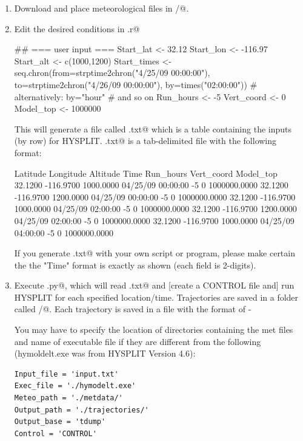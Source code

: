 \documentclass{article}
\renewenvironment{Schunk}{\vspace{\topsep}}{\vspace{\topsep}}
\begin{document}
\begin{enumerate}
\item Download and place meteorological files in \verb@metdata/@.
\item Edit the desired conditions in \verb@generateInput.r@
\begin{Schunk}
\begin{Soutput}
## === user input ===
Start_lat <- 32.12
Start_lon <- -116.97
Start_alt <- c(1000,1200)
Start_times <- seq.chron(from=strptime2chron("4/25/09 00:00:00"),
                         to=strptime2chron("4/26/09 00:00:00"),
                         by=times("02:00:00"))
                                        # alternatively: by="hour"
                                        # and so on
Run_hours <- -5
Vert_coord <- 0
Model_top <- 1000000
\end{Soutput}
\end{Schunk}

This will generate a file called \verb@input.txt@ which is a table containing
the inputs (by row) for HYSPLIT. \verb@input.txt@ is a tab-delimited
file with the following format:
  
\begin{Schunk}
\begin{Soutput}
Latitude  Longitude  Altitude  Time  Run_hours  Vert_coord  Model_top
32.1200  -116.9700  1000.0000  04/25/09 00:00:00  -5  0  1000000.0000
32.1200  -116.9700  1200.0000  04/25/09 00:00:00  -5  0  1000000.0000
32.1200  -116.9700  1000.0000  04/25/09 02:00:00  -5  0  1000000.0000
32.1200  -116.9700  1200.0000  04/25/09 02:00:00  -5  0  1000000.0000
32.1200  -116.9700  1000.0000  04/25/09 04:00:00  -5  0  1000000.0000
\end{Soutput}
\end{Schunk}

If you generate \verb@input.txt@ with your own script or program,
please make certain the the "Time" format is exactly as shown (each
field is 2-digits).

\item
  Execute \verb@runHYSPLIT.py@, which will read \verb@input.txt@ and
  [create a CONTROL file and] run HYSPLIT for each specified
  location/time. Trajectories are saved in a folder called
  \verb@trajectories/@. Each trajectory is saved in a file with the
  format of \verb@tdump-%y_%m_%d_%H-Alt@. 
  
  You may have to specify the location of directories containing the
  met files and name of executable file if they are different from the
  following (hymoldelt.exe was from HYSPLIT Version 4.6):
\begin{Verbatim}[formatcom=\color{darkred}]
Input_file = 'input.txt'
Exec_file = './hymodelt.exe'
Meteo_path = './metdata/'
Output_path = './trajectories/'
Output_base = 'tdump'
Control = 'CONTROL'
\end{Verbatim}
\end{enumerate}
\end{document}
